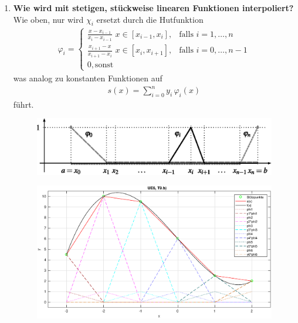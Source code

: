 \begin{enumerate}
		\pagebreak
		
		\item \textbf{Wie wird mit stetigen, stückweise linearen Funktionen interpoliert?} \\
			Wie oben, nur wird \(\chi_i\) ersetzt durch die Hutfunktion
			\begin{align*}
				\varphi_i=\begin{cases}
					\frac{x-x_{i-1}}{x_i-x_{i-1}}\,\,x\in[x_{i-1},x_i], & \text{falls } i=1,\dots,n \\
					\frac{x_{i+1}-x}{x_{i+1}-x_i}\,\,x\in[x_i,x_{i+1}], & \text{falls } i=0,\dots,n-1 \\
					0, \text{sonst}
				\end{cases}
			\end{align*}
			was analog zu konstanten Funktionen auf
			\begin{align*}
				s(x)=\sum_{i=0}^{n} y_i\,\varphi_i(x)
			\end{align*}
			führt.
			\begin{figure}[htbp]
				\centering
				\includegraphics[width=0.6\linewidth]{Kap3_3}
			\end{figure}
				\begin{figure}[htbp]
				\centering
				\includegraphics[width=1.0\textwidth]{T9b}
			\end{figure}
		
		\pagebreak
		

\end{enumerate}

